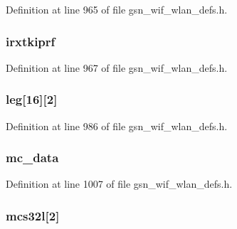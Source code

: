 Definition at line 965 of file gsn\_\-wif\_\-wlan\_\-defs.h.

\hypertarget{a00398_ad7d2a46f82d2a5d353c14138a860f348}{
\subsubsection[{irxtkiprf}]{ {\bf irxtkiprf}}}
\label{a00398_ad7d2a46f82d2a5d353c14138a860f348}


Definition at line 967 of file gsn\_\-wif\_\-wlan\_\-defs.h.

\hypertarget{a00398_aaf690b30c7bb3b5f1b5675f84c7c92e5}{
\subsubsection[{leg}]{ {\bf leg}\mbox{[}16\mbox{]}\mbox{[}2\mbox{]}}}
\label{a00398_aaf690b30c7bb3b5f1b5675f84c7c92e5}


Definition at line 986 of file gsn\_\-wif\_\-wlan\_\-defs.h.

\hypertarget{a00398_a5b5f1db253e2c61ab11fedd518d5480b}{
\subsubsection[{mc\_\-data}]{ {\bf mc\_\-data}}}
\label{a00398_a5b5f1db253e2c61ab11fedd518d5480b}


Definition at line 1007 of file gsn\_\-wif\_\-wlan\_\-defs.h.

\hypertarget{a00398_a6d5ba148df5237ec93937479cad72cd9}{
\subsubsection[{mcs32l}]{ {\bf mcs32l}\mbox{[}2\mbox{]}}}
\label{a00398_a6d5ba148df5237ec93937479cad72cd9}


